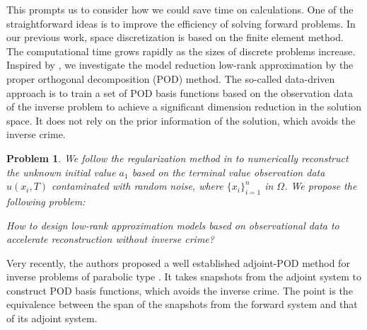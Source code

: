 \documentclass[11pt]{article}
\newtheorem{problem}{Problem}
\numberwithin{equation}{section}
\begin{document}
This prompts us to consider how we could save time on calculations. One of the straightforward ideas is to improve the efficiency of solving forward problems. In our previous work, space discretization is based on the finite element method. The computational time grows rapidly as the sizes of discrete problems increase.
Inspired by \cite{JinB2017sub_pod,Zhang2024pod}, we investigate the model reduction low-rank approximation by the proper orthogonal decomposition (POD) method. The so-called data-driven approach is to train a set of POD basis functions based on the observation data of the inverse problem to achieve a significant dimension reduction in the solution space. It does not rely on the prior information of the solution, which avoids the inverse crime.

\begin{problem}\label{prob-back}
We follow the regularization method in \cite{LiZhang2025,LiZhang2024} to numerically reconstruct the unknown initial value $a_1$ based on the terminal value observation data $u(x_i,T)$ contaminated with random noise, where $\{x_i\}_{i=1}^n$ in $ \Omega $. 
 We propose the following problem:

How to design low-rank approximation models based on observational data to accelerate reconstruction without inverse crime?
\end{problem}

Very recently, the authors proposed a well established adjoint-POD method for inverse problems of parabolic type \cite{ZhangZhang2024pod}. It takes snapshots from the adjoint system to construct POD basis functions, which avoids the inverse crime. The point is the equivalence between the span of the snapshots from the forward system and that of its adjoint system. 
\end{document}
